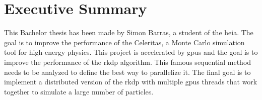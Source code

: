 \chapter{Executive Summary}
\label{ch:report-executive-summary}

This Bachelor thesis has been made by Simon Barras, a student of the \acrlong{heia}.
The goal is to improve the performance of the Celeritas, a Monte Carlo simulation
tool for high-energy physics.
This project is accelerated by \acrshort{gpu}s and the goal is to improve the
performance of the \acrshort{rkdp} algorithm.
This famous sequential method needs to be analyzed to define the best way to
parallelize it.
The final goal is to implement a distributed version of the \acrshort{rkdp}
with multiple \acrshort{gpu}s threads that work together to simulate a large
number of particles.
